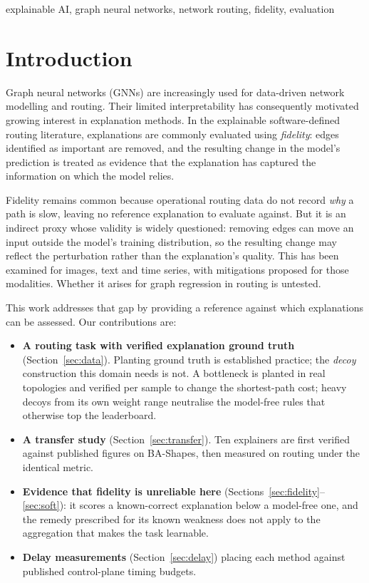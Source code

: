 \documentclass[conference]{IEEEtran}
\begin{document}
\begin{IEEEkeywords}
explainable AI, graph neural networks, network routing, fidelity, evaluation
\end{IEEEkeywords}

\section{Introduction}
Graph neural networks (GNNs) are increasingly used for data-driven network
modelling and routing. Their limited interpretability has consequently
motivated growing interest in explanation methods. In the explainable
software-defined routing literature, explanations are commonly evaluated
using \emph{fidelity}: edges identified as important are removed, and the
resulting change in the model's prediction is treated as evidence that the
explanation has captured the information on which the model relies.

Fidelity remains common because operational routing data do not record
\emph{why} a path is slow, leaving no reference explanation to evaluate
against. But it is an indirect proxy whose validity is widely questioned:
removing edges can move an input outside the model's training distribution, so
the resulting change may reflect the perturbation rather than the explanation's
quality. This has been examined for images, text and time series, with
mitigations proposed for those modalities. Whether it arises for graph
regression in routing is untested.

This work addresses that gap by providing a reference against which
explanations can be assessed. Our contributions are:

\begin{itemize}
  \item \textbf{A routing task with verified explanation ground truth}
  (Section~\ref{sec:data}). Planting ground truth is established practice; the
  \emph{decoy} construction this domain needs is not. A bottleneck is planted
  in real topologies and verified per sample to change the shortest-path cost;
  heavy decoys from its own weight range neutralise the model-free rules that
  otherwise top the leaderboard.
  \item \textbf{A transfer study} (Section~\ref{sec:transfer}). Ten explainers
  are first verified against published figures on BA-Shapes, then measured on
  routing under the identical metric.
  \item \textbf{Evidence that fidelity is unreliable here}
  (Sections~\ref{sec:fidelity}--\ref{sec:soft}): it scores a known-correct
  explanation below a model-free one, and the remedy prescribed for its known
  weakness does not apply to the aggregation that makes the task learnable.
  \item \textbf{Delay measurements} (Section~\ref{sec:delay}) placing each
  method against published control-plane timing budgets.
\end{itemize}
\end{document}
